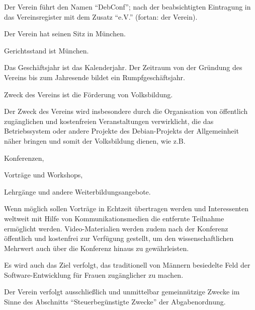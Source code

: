 \documentclass[draft]{scrartcl}
\newcommand{\VereinsName}{DebConf}
\begin{document}
\pagebreak
\ihead{\footnotesize \thetitle}
\begin{contract}


Der Verein führt den Namen "`\VereinsName"'; nach der beabsichtigten
Eintragung in das Vereinsregister mit dem Zusatz "`e.V."' (fortan: der
Verein).

Der Verein hat seinen Sitz in München.

Gerichtsstand ist München.

Das Geschäftsjahr ist das Kalenderjahr. Der Zeitraum von der Gründung des
Vereins bis zum Jahresende bildet ein Rumpfgeschäftsjahr.


\parnumberfalse

\label{Zweck}
Zweck des Vereins ist die Förderung von Volksbildung.

Der Zweck des Vereins wird insbesondere durch die Organisation von öffentlich
zu\-gäng\-li\-chen und kostenfreien Veranstaltungen verwirklicht, die das
Betriebs\-system oder andere Projekte des Debian-Projekts der Allgemeinheit
näher bringen und somit der Volksbildung dienen, wie z.B.

\begin{compactitem}
  \item Konferenzen,
  \item Vorträge und Workshops,
  \item Lehrgänge und andere Weiterbildungsangebote.
\end{compactitem}

Wenn möglich sollen Vorträge in Echtzeit übertragen werden und Interessenten
weltweit mit Hilfe von Kommunikationsmedien die entfernte Teilnahme ermöglicht
werden. Video-Materialien werden zudem nach der Konferenz öffentlich und
kostenfrei zur Verfügung gestellt, um den wissenschaftlichen Mehrwert auch
über die Konferenz hinaus zu gewährleisten.

Es wird auch das Ziel verfolgt, das traditionell von Männern besiedelte Feld
der Software-Entwicklung für Frauen zugänglicher zu machen.

\label{Gemeinnuetzigkeit}

Der Verein verfolgt ausschließlich und unmittelbar gemeinnützige Zwecke im
Sinne des Abschnitts "`Steuerbegünstigte Zwecke"' der Abgabenordnung.


\end{contract}
\end{document}
